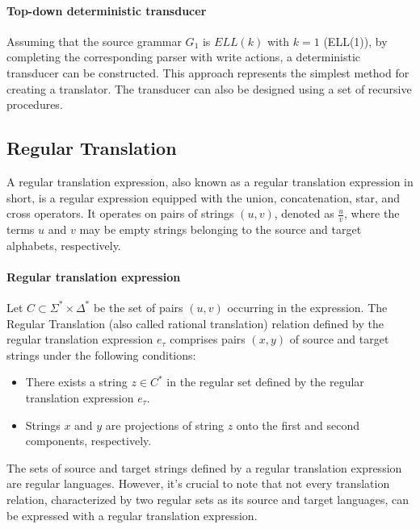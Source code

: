 \paragraph*{Top-down deterministic transducer}
Assuming that the source grammar $G_1$ is $\textit{ELL}(k)$ with $k = 1$ (ELL(1)), by completing the corresponding parser with write actions, a deterministic transducer can be constructed.
This approach represents the simplest method for creating a translator. 
The transducer can also be designed using a set of recursive procedures.

\subsection{Regular Translation}
A regular translation expression, also known as a regular translation expression in short, is a regular expression equipped with the union, concatenation, star, and cross operators. It operates on pairs of strings $\left( u, v \right)$, denoted as $\frac{u}{v}$, where the terms $u$ and $v$ may be empty strings belonging to the source and target alphabets, respectively.
\paragraph*{Regular translation expression}
Let $C \subset \Sigma^{*} \times \Delta^{*}$  be the set of pairs $\left( u, v \right)$ occurring in the expression. The Regular Translation (also called rational translation) relation defined by the regular translation expression $e_\tau$ comprises pairs $\left( x, y \right)$ of source and target strings under the following conditions:
\begin{itemize}
    \item There exists a string $z \in C^{*}$ in the regular set defined by the regular translation expression $e_\tau$.
    \item Strings $x$ and $y$ are projections of string $z$ onto the first and second components, respectively.
\end{itemize}
The sets of source and target strings defined by a regular translation expression are regular languages. However, it's crucial to note that not every translation relation, characterized by two regular sets as its source and target languages, can be expressed with a regular translation expression.

